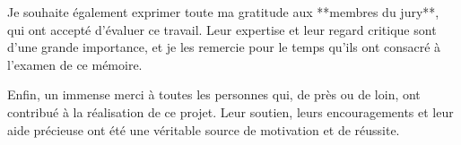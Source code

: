 \par \vspace{5mm}

Je souhaite également exprimer toute ma gratitude aux **membres du jury**, qui ont accepté d’évaluer ce travail. Leur expertise et leur regard critique sont d’une grande importance, et je les remercie pour le temps qu’ils ont consacré à l’examen de ce mémoire.

\par \vspace{5mm}

Enfin, un immense merci à toutes les personnes qui, de près ou de loin, ont contribué à la réalisation de ce projet. Leur soutien, leurs encouragements et leur aide précieuse ont été une véritable source de motivation et de réussite.


